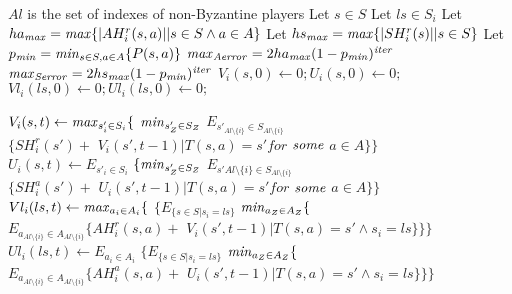 %
\begin{algorithm}[H]
	\caption{$\mi{CheckNash}$($\langle \mathcal{M}^b$,$\mathcal{M}^a,\mathcal{M}^r \rangle$, $\mi{iter}$, $\mi{perfect}$)}
	\label{checknash}
	\begin{algorithmic}[1]
		\LCOMMENT $Al$ is the set of indexes of non-Byzantine players
		\STATE Let $s \in S$
		\STATE Let $ls \in S_i$
		\STATE Let $ha_{\mathit{max}}= \mathit{max}\{|AH^r_i(s,a)| | s \in S \wedge a \in A\}$
		\STATE Let $hs_{\mathit{max}}= \mathit{max}\{|SH^r_i(s)| | s \in S\}$
	    \STATE Let $p_{\mathit{min}}= \mathit{min}_{s \in S, a \in A} \{P(s,a)\} $
	    \STATE $\mathit{max}_{\mathit{Aerror}} =2ha_{\mathit{max}}(1-p_{\mathit{min}})^{\mathit{iter}}$
	    \STATE $\mathit{max}_{\mathit{Serror}} =2hs_{\mathit{max}}(1-p_{\mathit{min}})^{\mathit{iter}}$
		\STATE $V_{i}(s,0) \leftarrow 0 ;  U_{i}(s,0) \leftarrow 0 ;$
		\STATE $Vl_{i}(ls,0) \leftarrow 0 ;  Ul_{i}(ls,0) \leftarrow 0 ;$
		
		
		\STATE	$V_{i}(s,t) \leftarrow
		\mathit{max} _{s'_i \in S_i} \{$
		$\mathit{min}_{s'_{Z} \in S_{Z}}$ 
		$E_{s'_{Al \setminus \{i\}} \in S_{Al \setminus \{i\}}}$ \\
		$\{SH^r_i(s') +$ $  {V_i}(s',t-1) | T(s,a)=s' for$ $\mathit{some}$  $a \in A \} \}
		$
		\\ 
		
		
		\STATE	$U_{i}(s,t) \leftarrow
		E _{s'_i \in S_i}$
		$\{ \mathit{min}_{s'_{Z} \in S_{Z}}$ 
		$E_{s'{Al \setminus \{i\}} \in S_{Al \setminus \{i\}}}$ \\
		$\{SH^a_i(s') +$ $  {U_i}(s',t-1) | T(s,a)=s' for$ $\mathit{some}$  $a \in A  \}\}
		$\\	
	
		\STATE	$Vl_{i}(ls,t) \leftarrow
		\mathit{max} _{a_i \in A_i} \{$
			$\{E_{\{s \in S | s_i=ls\}} $ 
			$\mathit{min}_{a_{Z} \in A_{Z}} \{$ \\
			$E_{a_{Al \setminus \{i\}} \in A_{Al \setminus \{i\}}}\{AH^r_i(s,a) +$ $  {V_i}(s',t-1) | T(s,a)=s' \wedge s_i=ls \} \} \}
			$\\
		
		
		\STATE	$Ul_{i}(ls,t) \leftarrow
		E _{a_i \in A_i}$
		$\{E_{\{s \in S | s_i=ls\}} $ 
		$\mathit{min}_{a_{Z} \in A_{Z}} \{$ \\
		$E_{a_{Al \setminus \{i\}} \in A_{Al \setminus \{i\}}}\{AH^a_i(s,a) +$ $  {U_i}(s',t-1) | T(s,a)=s' \wedge s_i=ls \} \} \}
		$\\		
		\ENDFOR
		

\end{algorithmic}
\end{algorithm}

